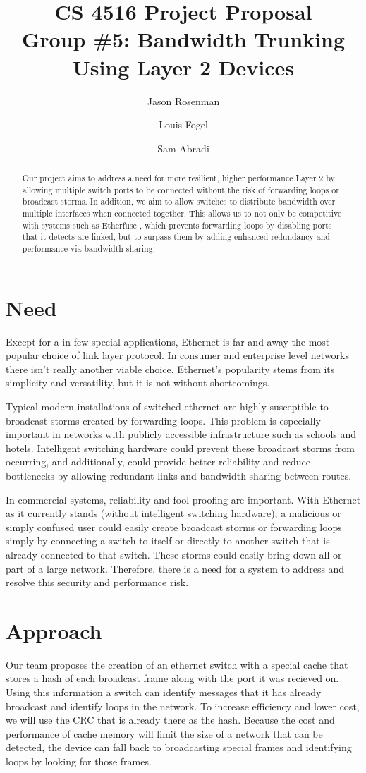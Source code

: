 \documentclass{article}
\title{CS 4516 Project Proposal\\Group \#5: Bandwidth Trunking Using Layer 2 Devices}
\author{Jason Rosenman \and Louis Fogel \and Sam Abradi}
\date{}
\begin{document}
\maketitle
\begin{abstract}
	Our project aims to address a need for more resilient, higher performance Layer 2 by allowing multiple switch ports to be connected without the risk of forwarding loops or broadcast storms.
	In addition, we aim to allow switches to distribute bandwidth over multiple interfaces when connected together.
	This allows us to not only be competitive with systems such as Etherfuse \cite{etherfuse}, which prevents forwarding loops by disabling ports that it detects are linked, but to surpass them by adding enhanced redundancy and performance via bandwidth sharing.
\end{abstract}
\section{Need}
	Except for a in few special applications, Ethernet is far and away the most popular choice of link layer protocol.
	In consumer and enterprise level networks there isn’t really another viable choice.
	Ethernet’s popularity stems from its simplicity and versatility, but it is not without shortcomings.

	Typical modern installations of switched ethernet are highly susceptible to broadcast storms created by forwarding loops.
	This problem is especially important in networks with publicly accessible infrastructure such as schools and hotels.
	Intelligent switching hardware could prevent these broadcast storms from occurring, and additionally, could provide better reliability and reduce bottlenecks by allowing redundant links and bandwidth sharing between routes.
	
	In commercial systems, reliability and fool-proofing are important.
	With Ethernet as it currently stands (without intelligent switching hardware), a malicious or simply confused user could easily create broadcast storms or forwarding loops simply by connecting a switch to itself or directly to another switch that is already connected to that switch.
	These storms could easily bring down all or part of a large network.
	Therefore, there is a need for a system to address and resolve this security and performance risk.
\section{Approach}
	Our team proposes the creation of an ethernet switch with a special cache that stores a hash of each broadcast frame along with the port it was recieved on.
	Using this information a switch can identify messages that it has already broadcast and identify loops in the network.
        To increase efficiency and lower cost, we will use the CRC that is already there as the hash.
	Because the cost and performance of cache memory will limit the size of a network that can be detected, the device can fall back to broadcasting special frames and identifying loops by looking for those frames.
\end{document}
